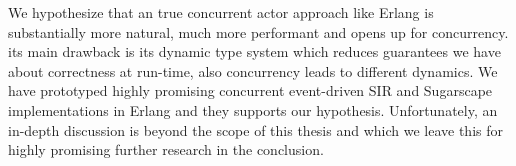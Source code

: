 We hypothesize that an true concurrent actor approach like Erlang is substantially more natural, much more performant and opens up for concurrency. its main drawback is its dynamic type system which reduces guarantees we have about correctness at run-time, also concurrency leads to different dynamics. We have prototyped highly promising concurrent event-driven SIR and Sugarscape implementations in Erlang and they supports our hypothesis. Unfortunately, an in-depth discussion is beyond the scope of this thesis and which we leave this for highly promising further research in the conclusion.


%
